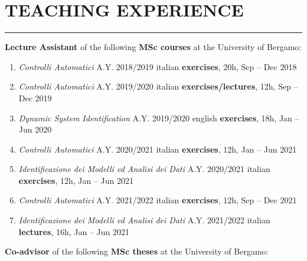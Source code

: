 \documentclass[10pt]{article}
\newcommand{\cvsection}[1]{\section*{\centering\normalsize\uppercase{#1}}\vspace{-16pt}\rule{\linewidth}{0.2pt}\vspace{6pt}}
\begin{document}
\vspace{-10pt}
\cvsection{teaching experience}
\textbf{Lecture Assistant} of the following \textbf{MSc courses} at the University of Bergamo:
\begin{enumerate}
	\setlength\itemsep{-14pt}
	\item \textit{Controlli Automatici} A.Y. 2018/2019 \hfill italian \textbf{exercises}, 20h, Sep – Dec 2018\\
	\item \textit{Controlli Automatici} A.Y. 2019/2020 \hfill italian \textbf{exercises/lectures}, 12h, Sep – Dec 2019\\
	\item \textit{Dynamic System Identification} A.Y. 2019/2020 \hfill english \textbf{exercises}, 18h, Jan – Jun 2020\\
	\item \textit{Controlli Automatici} A.Y. 2020/2021 \hfill italian \textbf{exercises}, 12h, Jan – Jun 2021\\
	\item \textit{Identificazione dei Modelli ed Analisi dei Dati} A.Y. 2020/2021 \hfill italian \textbf{exercises}, 12h, Jan – Jun 2021\\
	\item \textit{Controlli Automatici} A.Y. 2021/2022 \hfill italian \textbf{exercises}, 12h, Sep – Dec 2021\\
	\item \textit{Identificazione dei Modelli ed Analisi dei Dati} A.Y. 2021/2022 \hfill italian \textbf{lectures}, 16h, Jan – Jun 2021
\end{enumerate}
\vspace{6pt} %
\textbf{Co-advisor} of the following \textbf{MSc theses} at the University of Bergamo:
\end{document}
